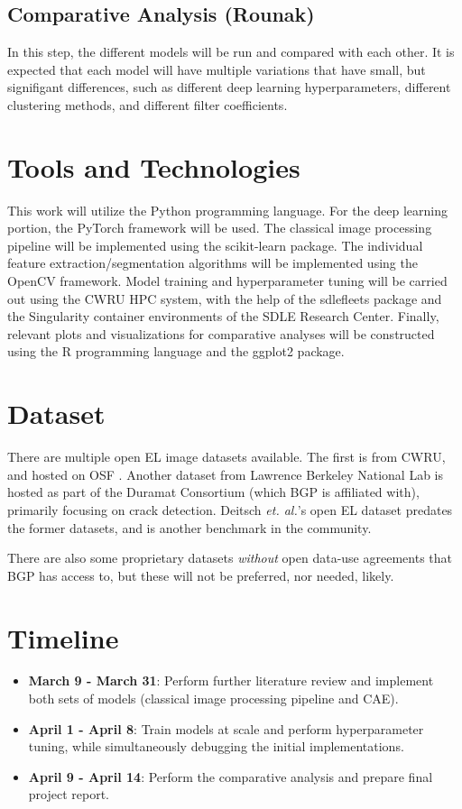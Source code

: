 \documentclass[12pt]{article}
\begin{document}
\subsection{Comparative Analysis (Rounak)}
In this step, the different models will be run and compared with each other. 
It is expected that each model will have multiple variations that have small, but signifigant differences, such as different deep learning hyperparameters, different clustering methods, and different filter coefficients. 

\section{Tools and Technologies}
This work will utilize the Python programming language. 
For the deep learning portion, the PyTorch framework will be used. 
The classical image processing pipeline will be implemented using the scikit-learn package. The individual feature extraction/segmentation algorithms will be implemented using the OpenCV framework.
Model training and hyperparameter tuning will be carried out using the CWRU HPC system, with the help of the sdlefleets package and the Singularity container environments of the SDLE Research Center. 
Finally, relevant plots and visualizations for comparative analyses will be constructed using the R programming language and the ggplot2 package. 

\section{Dataset}
There are multiple open EL image datasets available. 
The first is from CWRU, and hosted on OSF \cite{noauthor_osf_nodate}. 
Another dataset \cite{chen_automated_2022} from Lawrence Berkeley National Lab is hosted as part of the Duramat Consortium (which BGP is affiliated with), primarily focusing on crack detection. 
Deitsch \textit{et. al.}'s open EL dataset \cite{deitsch_automatic_2019} predates the former datasets, and is another benchmark in the community. 

There are also some proprietary datasets \textit{without} open data-use agreements that BGP has access to, but these will not be preferred, nor needed, likely. 

\section{Timeline}

\begin{itemize}
    \item \textbf{March 9 - March 31}: Perform further literature review and implement both sets of models (classical image processing pipeline and CAE).

    \item \textbf{April 1 - April 8}: Train models at scale and perform hyperparameter tuning, while simultaneously debugging the initial implementations.

    \item \textbf{April 9 - April 14}: Perform the comparative analysis and prepare final project report.
\end{itemize}
\end{document}
